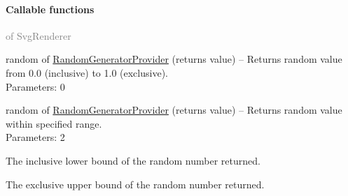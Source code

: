 	\paragraph{Callable functions}\textcolor{gray}{of SvgRenderer}
	\begin{description*}
		\item[random] of \hyperref[Malsys.Processing.Components.Common.RandomGeneratorProvider]{RandomGeneratorProvider}
		(returns value)
			-- Returns random value from 0.0 (inclusive) to 1.0 (exclusive).
		\\ Parameters: 0
		\item[random] of \hyperref[Malsys.Processing.Components.Common.RandomGeneratorProvider]{RandomGeneratorProvider}
		(returns value)
			-- Returns random value within specified range.
		\\ Parameters: 2
			\begin{enumerate*}
				\item The inclusive lower bound of the random number returned.
				\item             The exclusive upper bound of the random number returned.
			\end{enumerate*}
	\end{description*}
